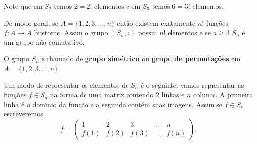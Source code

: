 Note que em $S_2$ temos $2 = 2!$ elementos e em $S_3$ temos $6 = 3!$ elementos.

De modo geral, se $A = \{1, 2, 3, \dots, n\}$ ent\~ao existem exatamente $n!$ fun\c{c}\~oes $f : A \to A$ bijetoras. Assim o grupo $(S_n, \circ)$ possui $n!$ elementos e se $n \geqslant 3$ $S_n$ \'e um grupo n\~ao comutativo.

\begin{definicao}
	O grupo $S_n$ \'e chamado de \textbf{grupo sim\'etrico} ou \textbf{grupo de permuta\c{c}\~oes} em $A = \{1, 2, 3, \dots, n\}$.
\end{definicao}


Um modo de representar os elementos de $S_n$ \'e o seguinte: vamos representar as fun\c{c}\~oes $f \in S_n$ na forma de uma matriz contendo 2 linhas e $n$ colunas. A primeira linha \'e o dom{\'\i}nio da fun\c{c}\~ao e a segunda cont\'em suas imagens. Assim se $f \in S_n$ escreveremos
\[
	f = \begin{pmatrix}
		1 & 2 & 3 & \dots & n\\
		f(1) & f(2) & f(3) & \dots & f(n)
	\end{pmatrix}.
\]


